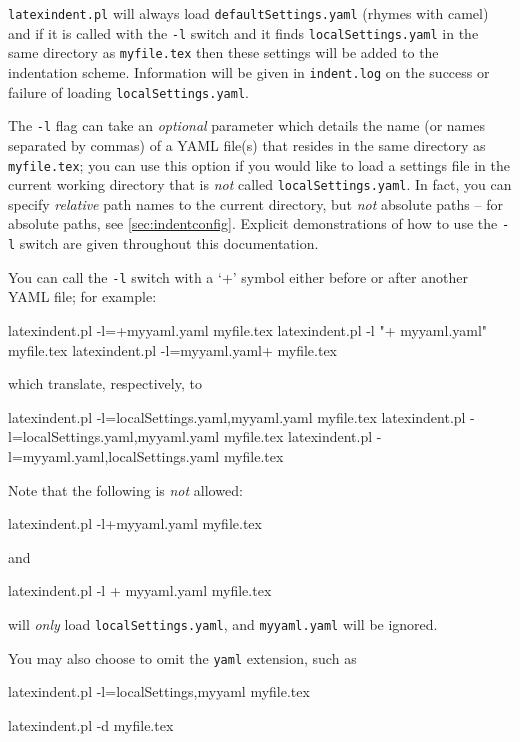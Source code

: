	\label{page:localswitch}
	\texttt{latexindent.pl} will always load \texttt{defaultSettings.yaml} (rhymes with camel)
	and if it is called with the \texttt{-l} switch and it finds \texttt{localSettings.yaml}
	in the same directory as \texttt{myfile.tex} then these settings will be
	added to the indentation scheme. Information will be given in \texttt{indent.log} on
	the success or failure of loading \texttt{localSettings.yaml}.

	The \texttt{-l} flag can take an \emph{optional} parameter which details the name (or names separated by commas) of a YAML file(s)
	that resides in the same directory as \texttt{myfile.tex}; you can use this option if you would
	like to load a settings file in the current working directory that is \emph{not} called \texttt{localSettings.yaml}.
	In fact, you can specify \emph{relative} path names to the current directory, but \emph{not}
	absolute paths -- for absolute paths, see \vref{sec:indentconfig}.
	Explicit demonstrations of how to use the \texttt{-l} switch are given throughout this documentation.

	You can call the \texttt{-l} switch with a `+' symbol either before or after
	another YAML file; for example:
	\begin{commandshell}
latexindent.pl -l=+myyaml.yaml  myfile.tex
latexindent.pl -l "+ myyaml.yaml" myfile.tex
latexindent.pl -l=myyaml.yaml+  myfile.tex
    \end{commandshell}
	which translate, respectively, to
	\begin{commandshell}
latexindent.pl -l=localSettings.yaml,myyaml.yaml myfile.tex
latexindent.pl -l=localSettings.yaml,myyaml.yaml myfile.tex
latexindent.pl -l=myyaml.yaml,localSettings.yaml myfile.tex
    \end{commandshell}
	Note that the following is \emph{not} allowed:
	\begin{commandshell}
latexindent.pl -l+myyaml.yaml myfile.tex
    \end{commandshell}
	and
	\begin{commandshell}
latexindent.pl -l + myyaml.yaml myfile.tex
    \end{commandshell}
	will \emph{only} load \texttt{localSettings.yaml}, and \texttt{myyaml.yaml} will be ignored.

	You may also choose to omit the \texttt{yaml} extension, such as
	\begin{commandshell}
latexindent.pl -l=localSettings,myyaml myfile.tex
    \end{commandshell}
	\begin{commandshell}
latexindent.pl -d myfile.tex
      \end{commandshell}

